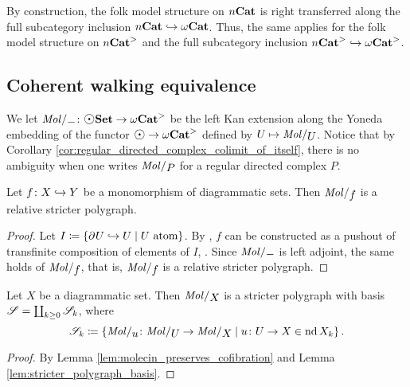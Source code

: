 \begin{rmk}\label{rmk:also_right_transferred_n_folk}
    By construction, the folk model structure on \( {n\mathbf{Cat}} \) is right transferred along the full subcategory inclusion \( {n\mathbf{Cat}} \hookrightarrow {\omega\mathbf{Cat}} \).
    Thus, the same applies for the folk model structure on \( {n\mathbf{Cat}}^> \) and the full subcategory inclusion \( {n\mathbf{Cat}}^> \hookrightarrow {\omega\mathbf{Cat}}^> \).
\end{rmk}

\subsection{Coherent walking equivalence}

We let \( \molecin{-} \colon \dgmSet \to \somegaCat \) be the left Kan extension along the Yoneda embedding of the functor \( \atom \to \somegaCat \) defined by \( U \mapsto \molecin{U} \).
Notice that by Corollary \ref{cor:regular_directed_complex_colimit_of_itself}, there is no ambiguity when one writes \( \molecin{P} \) for a regular directed complex \( P \).

\begin{lem} \label{lem:molecin_preserves_cofibration}
    Let \( f \colon X \hookrightarrow Y \) be a monomorphism of diagrammatic sets.
    Then \( \molecin{f} \) is a relative stricter polygraph.
\end{lem}
\begin{proof}
    Let \( I \coloneqq \left\{ {\partial_{}^{} U \hookrightarrow U \mid U \text{ atom}} \right\} \).
    By \cite[Remark 2.9]{chanavat2024htpy}, \( f \) can be constructed as a pushout of transfinite composition of elements of \( I \), .
    Since \( \molecin{-} \) is left adjoint, the same holds of \( \molecin{f} \), that is, \( \molecin{f} \) is a relative stricter polygraph.
\end{proof}

\begin{cor} \label{cor:molecin_polygraph_with_basis}
    Let \( X \) be a diagrammatic set. 
    Then \( \molecin{X} \) is a stricter polygraph with basis \( \mathscr{S} = \coprod_{k \geq 0} \mathscr{S}_k \), where
    \begin{equation*}
        \cls{S}_k \eqdef \set{\molecin{u} \colon \molecin{U} \to \molecin{X} \mid u \colon U \to X \in \gr{k}{\nd X}}.
    \end{equation*}
\end{cor}
\begin{proof}
    By Lemma \ref{lem:molecin_preserves_cofibration} and Lemma \ref{lem:stricter_polygraph_basis}.
\end{proof}

